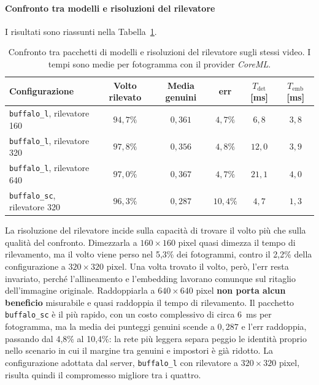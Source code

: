 \paragraph{Confronto tra modelli e risoluzioni del rilevatore}
I risultati sono riassunti nella Tabella~\ref{tab:confrontoModelli}.
\begin{table}[htbp]
    \centering
    \footnotesize
    \renewcommand{\arraystretch}{1.25}
    \begin{tabular*}{\textwidth}{@{\extracolsep{\fill}}lccccc@{}}
        \hline
        \textbf{Configurazione} & \textbf{Volto rilevato} & \textbf{Media genuini} & \textbf{\gls{err}} & \textbf{$T_{\text{det}}$ [ms]} & \textbf{$T_{\text{emb}}$ [ms]} \\
        \hline
        \texttt{buffalo\_l}, rilevatore 160 & $94{,}7\%$ & $0{,}361$ & $4{,}7\%$ & $6{,}8$ & $3{,}8$ \\
        \texttt{buffalo\_l}, rilevatore 320 & $97{,}8\%$ & $0{,}356$ & $4{,}8\%$ & $12{,}0$ & $3{,}9$ \\
        \texttt{buffalo\_l}, rilevatore 640 & $97{,}0\%$ & $0{,}367$ & $4{,}7\%$ & $21{,}1$ & $4{,}0$ \\
        \texttt{buffalo\_sc}, rilevatore 320 & $96{,}3\%$ & $0{,}287$ & $10{,}4\%$ & $4{,}7$ & $1{,}3$ \\
        \hline
    \end{tabular*}
    \caption[Confronto tra pacchetti di modelli e risoluzioni del rilevatore]{Confronto tra pacchetti di modelli e risoluzioni del rilevatore sugli stessi video. I tempi sono medie per fotogramma con il provider \textit{CoreML}.}
    \label{tab:confrontoModelli}
\end{table}
La risoluzione del rilevatore incide sulla capacità di trovare il volto più che sulla qualità del confronto.
Dimezzarla a $160 \times 160$ pixel quasi dimezza il tempo di rilevamento, ma il volto viene perso nel 5,3\% dei fotogrammi, contro il 2,2\% della configurazione a $320 \times 320$ pixel.
Una volta trovato il volto, però, l'\gls{err} resta invariato, perché l'allineamento e l'embedding lavorano comunque sul ritaglio dell'immagine originale.
Raddoppiarla a $640 \times 640$ pixel \textbf{non porta alcun beneficio} misurabile e quasi raddoppia il tempo di rilevamento.
Il pacchetto \texttt{buffalo\_sc} è il più rapido, con un costo complessivo di circa 6~ms per fotogramma, ma la media dei punteggi genuini scende a $0{,}287$ e l'\gls{err} raddoppia, passando dal 4,8\% al 10,4\%: la rete più leggera separa peggio le identità proprio nello scenario in cui il margine tra genuini e impostori è già ridotto.
La configurazione adottata dal server, \texttt{buffalo\_l} con rilevatore a $320 \times 320$ pixel, risulta quindi il compromesso migliore tra i quattro.

